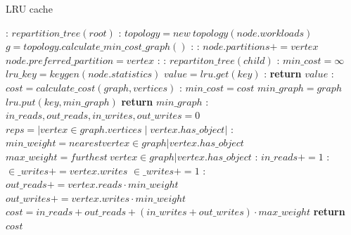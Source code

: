 \begin{algorithm}
  \caption{LRU cache}\label{alg:lru}
  \begin{algorithmic}[1]
    :
  \State $repartition\_tree(root)$
  \EndFunction
  :
      \State $topology = new\ topology(node.workloads)$
      \State $g = topology.calculate\_min\_cost\_graph()$
      :
        :
        \State $node.partitions += vertex$
            \State $node.preferred\_partition = vertex$
          \EndIf
        \EndIf
      \EndFor
    \EndIf
    :
      :
        \State $repartiton\_tree(child)$
        \EndFor
    \EndIf
    \EndFunction
    :
    \State $min\_cost = \infty$
    \State $lru\_key = keygen(node.statistics)$
    \State $value = lru.get(key)$
    :
      \State \textbf{return} $value$
    \EndIf
      :
        \State $cost = calculate\_cost(graph, vertices)$
        :
          \State $min\_cost = cost$
          \State $min\_graph = graph$
        \EndIf
      \EndFor
    \State $lru.put(key, min\_graph)$
    \State \textbf{return} $min\_graph$
    \EndFunction
    :
      \State $in\_reads, out\_reads, in\_writes, out\_writes = 0$
      \State $reps = |vertex \in graph.vertices \mid vertex.has\_object|$
      :
      \State $min\_weight = nearest vertex \in graph | vertex.has\_object$
      \State $max\_weight = furthest\ vertex \in graph | vertex.has\_object$
        :
          \State $in\_reads+= 1$
          :
          \State $\in\_writes+= vertex.writes$
          \Else
          \State  $\in\_writes+= 1 $
          \EndIf
        \Else:
          \State $out\_reads += vertex.reads \cdot min\_weight$
          \State $out\_writes += vertex.writes \cdot min\_weight$
        \EndIf
      \EndFor
      \State $cost = in\_reads+ out\_reads + (in\_writes+ out\_writes) \cdot max\_weight$
      \State \textbf{return} $cost$
  \EndFunction
  \end{algorithmic}
  \end{algorithm}


